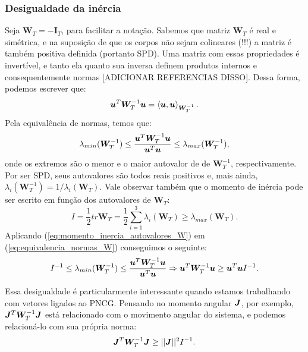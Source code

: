 \subsubsection{Desigualdade da inércia}
Seja $\bm W_T = - \bm I_T$, para facilitar a notação. Sabemos que matriz $\bm W_T$ é real e simétrica, e na suposição de que os corpos não sejam colineares (!!!) a matriz é também positiva definida (portanto SPD). Uma matriz com essas propriedades é invertível, e tanto ela quanto sua inversa definem produtos internos e consequentemente normas [ADICIONAR REFERENCIAS DISSO]. Dessa forma, podemos escrever que:
\begin{equation}
    \bm u^T \bm W_T^{-1} \bm u = \left\langle \bm u, \bm u \right\rangle_{\bm W_T^{-1}}.
\end{equation}
Pela equivalência de normas, temos que:
\begin{equation}\label{eq:equivalencia_normas_W}
    \lambda_{min} (\bm W_T^{-1}) \leq \dfrac{\bm u^T \bm W_T^{-1} \bm u}{\bm u^T \bm u} \leq \lambda_{max} (\bm W_T^{-1}),
\end{equation}
onde os extremos são o menor e o maior autovalor de de $\bm W_T^{-1}$, respectivamente. Por ser SPD, seus autovalores são todos reais positivos e, mais ainda, $\lambda_i (\bm W_T^{-1}) = 1/\lambda_i(\bm W_T)$. Vale observar também que o momento de inércia pode ser escrito em função dos autovalores de $\bm W_T$:
\begin{equation}\label{eq:momento_inercia_autovalores_W}
    I = \dfrac{1}{2} tr \bm W_T = \dfrac{1}{2} \sum_{i=1}^3 \lambda_i (\bm W_T) \geq \lambda_{max}(\bm W_T).
\end{equation}
Aplicando (\ref{eq:momento_inercia_autovalores_W}) em (\ref{eq:equivalencia_normas_W}) conseguimos o seguinte:
\begin{equation}\label{eq:desigualdade_inercia}
    I^{-1} \leq \lambda_{min} (\bm W_T^{-1}) \leq \dfrac{\bm u^T \bm W_T^{-1} \bm u}{\bm u^T \bm u}
    \Rightarrow
    \bm u^T \bm W_T^{-1} \bm u \geq \bm u^T \bm u I^{-1}.
\end{equation}

Essa desigualdade é particularmente interessante quando estamos trabalhando com vetores ligados ao PNCG. Pensando no momento angular $\bm J$, por exemplo, $\bm J^T \bm W_T^{-1} \bm J$ está relacionado com o movimento angular do sistema, e podemos relacioná-lo com sua própria norma:
\begin{equation}\label{eq:desigualdade_inercia_angular}
    \bm J^T \bm W_T^{-1} \bm J \geq || \bm J ||^2 I^{-1}.
\end{equation}